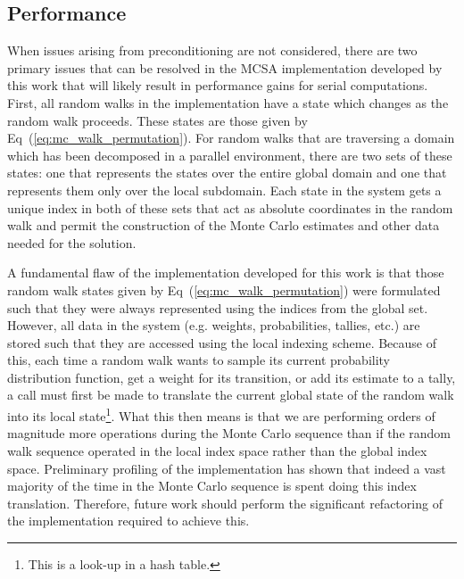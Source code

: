 \subsection{Performance}
\label{subsec:future_performance}

When issues arising from preconditioning are not considered, there are
two primary issues that can be resolved in the MCSA implementation
developed by this work that will likely result in performance gains
for serial computations. First, all random walks in the implementation
have a state which changes as the random walk proceeds. These states
are those given by Eq~(\ref{eq:mc_walk_permutation}). For random walks
that are traversing a domain which has been decomposed in a parallel
environment, there are two sets of these states: one that represents
the states over the entire global domain and one that represents them
only over the local subdomain. Each state in the system gets a unique
index in both of these sets that act as absolute coordinates in the
random walk and permit the construction of the Monte Carlo estimates
and other data needed for the solution. 

A fundamental flaw of the implementation developed for this work is
that those random walk states given by
Eq~(\ref{eq:mc_walk_permutation}) were formulated such that they were
always represented using the indices from the global set. However, all
data in the system (e.g. weights, probabilities, tallies, etc.) are
stored such that they are accessed using the local indexing
scheme. Because of this, each time a random walk wants to sample its
current probability distribution function, get a weight for its
transition, or add its estimate to a tally, a call must first be made
to translate the current global state of the random walk into its
local state\footnote{This is a look-up in a hash table.}. What this
then means is that we are performing orders of magnitude more
operations during the Monte Carlo sequence than if the random walk
sequence operated in the local index space rather than the global
index space. Preliminary profiling of the implementation has shown
that indeed a vast majority of the time in the Monte Carlo sequence is
spent doing this index translation. Therefore, future work should
perform the significant refactoring of the implementation required to
achieve this.

